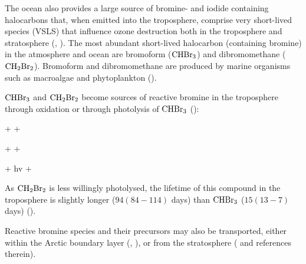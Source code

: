\medskip

The ocean also provides a large source of bromine- and iodide containing halocarbons that, when emitted into the troposphere, comprise very short-lived species (VSLS) that influence ozone destruction both in the troposphere and stratosphere (\cite{ziska}, \cite{Simpson2015}). The most abundant short-lived halocarbon (containing bromine) in the atmosphere and ocean are bromoform ($\mathrm{CHBr_3}$) and dibromomethane ($\mathrm{CH_2Br_2}$). Bromoform and dibromomethane are produced by marine organisms such as macroalgae and phytoplankton (\cite{Quack2003}).


\medskip

$\mathrm{CHBr_3}$ and $\mathrm{CH_2Br_2}$ become sources of reactive bromine in the troposphere through oxidation or through photolysis of $\mathrm{CHBr_3}$ (\cite{Hossaini2016_chlorine}):


\begin{reaction}
     +   + 
    \label{R:10}
\end{reaction} 
\begin{reaction}
     +   + 
    \label{R:11}
\end{reaction}
\begin{reaction}
     + hv  + 
    \label{R:12}
\end{reaction}

As $\mathrm{CH_2Br_2}$ is less willingly photolysed, the lifetime of this compound in the troposphere is slightly longer ($94 (84-114)$ days) than $\mathrm{CHBr_3}$ ($15 (13-7)$ days) (\cite{Hossaini2016_chlorine}).

\medskip

Reactive bromine species and their precursors may also be transported, either within the Arctic boundary layer (\cite{Luo2018}, \cite{Schmidt}), or from the stratosphere (\cite{Hossaini2016_chlorine} and references therein). 

